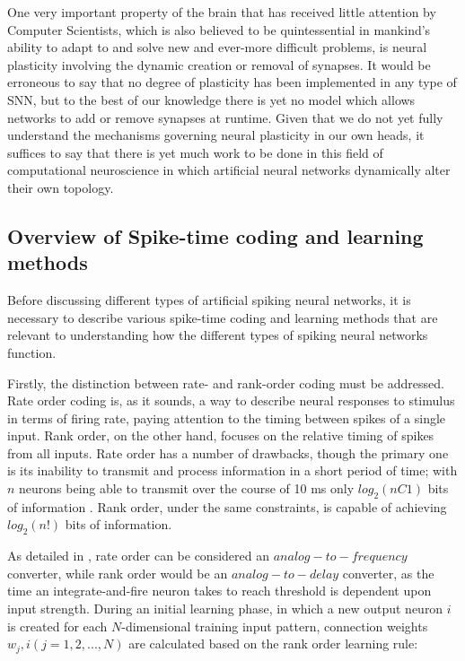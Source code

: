 \documentclass[journal]{./sty/IEEEtran}
\begin{document}
One very important property of the brain that has received little attention by Computer Scientists, which is also believed to be quintessential in mankind's ability to adapt to and solve new and ever-more difficult problems, is neural plasticity involving the dynamic creation or removal of synapses.
It would be erroneous to say that no degree of plasticity has been implemented in any type of SNN, but to the best of our knowledge there is yet no model which allows networks to add or remove synapses at runtime. 
Given that we do not yet fully understand the mechanisms governing neural plasticity in our own heads, it suffices to say that there is yet much work to be done in this field of computational neuroscience in which artificial neural networks dynamically alter their own topology.

\subsection{Overview of Spike-time coding and learning methods}
Before discussing different types of artificial spiking neural networks, 
it is necessary to describe various spike-time coding and learning methods 
that are relevant to understanding how the different types of spiking neural networks function.

Firstly, the distinction between rate- and rank-order coding must be addressed. 
Rate order coding is, as it sounds, a way to describe neural responses to stimulus 
in terms of firing rate, paying attention to the timing between spikes of a single input. 
Rank order, on the other hand, focuses on the relative timing of spikes from all inputs. 
Rate order has a number of drawbacks, though the primary one is its inability to transmit 
and process information in a short period of time; with \(n\) neurons being able 
to transmit over the course of 10 ms only $log_2(n C 1)$ bits of information \cite{RO:Thorpe}.
Rank order, under the same constraints, is capable of achieving $log_2(n!)$ bits of information. \cite{deSNN:Kasabov}

As detailed in \cite{RO:Thorpe}, rate order can be considered an $analog-to-frequency$ converter, while rank order would be an $analog-to-delay$ converter, as the time an integrate-and-fire neuron takes to reach threshold is dependent upon input strength. 
During an initial learning phase, in which a new output neuron $i$ is created for each $N$-dimensional training input pattern, connection weights $w_j,i (j = 1,2,...,N)$ are calculated based on the rank order learning rule:
\end{document}
